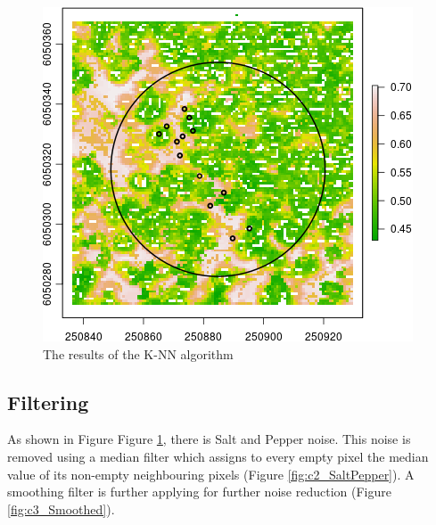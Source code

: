 \documentclass{subfiles}
\begin{document}
 				\begin{figure} [h!]			
 					\centering
 					\includegraphics[width=.49\textwidth]{img/dead/c1_knn}
 					\caption{The results of the K-NN algorithm} 
 					\label{fig:c1_knn}
 				\end{figure}

 
 
  \subsection{Filtering}\label{sec:filtering}
  As shown in Figure Figure \ref{fig:c1_knn}, there is Salt and Pepper noise. This noise is removed using a median filter which assigns to every empty pixel the median value of its non-empty neighbouring pixels  (Figure \ref{fig:c2_SaltPepper}). A smoothing filter is further applying for further noise reduction (Figure \ref{fig:c3_Smoothed}). 
\end{document}
